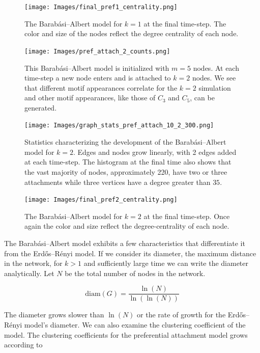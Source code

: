 \begin{figure}
    \texttt{[image: Images/final\_pref1\_centrality.png]}
    \centering
    \caption{The Barabási–Albert model for $k=1$ at the final time-step. The color and size of the nodes reflect
            the degree centrality of each node.}
\end{figure}

\begin{figure}[h!]
    \texttt{[image: Images/pref\_attach\_2\_counts.png]}
    \centering
    \caption{This Barabási–Albert model is initialized with $m=5$ nodes.
    At each time-step a new node enters and is attached to $k=2$ nodes. We see that different motif appearances
    correlate for the $k=2$ simulation and other motif appearances, like those of $C_3$ and $C_5$, can be generated.}
    \label{fig:BA2}
\end{figure}

\begin{figure}[h!]
    \texttt{[image: Images/graph\_stats\_pref\_attach\_10\_2\_300.png]}
    \centering
    \caption{Statistics characterizing the development of the Barabási–Albert model for $k=2$.
    Edges and nodes grow linearly, with 2 edges added at each time-step. The histogram at
    the final time also shows that the vast majority of nodes, approximately 220, have two or three attachments
    while three vertices have a degree greater than $35$.}
\end{figure}

\begin{figure}
    \texttt{[image: Images/final\_pref2\_centrality.png]}
    \centering
    \caption{The Barabási–Albert model for $k=2$ at the final time-step. Once again the color and size
            reflect the degree-centrality of each node.}
\end{figure}

The Barabási–Albert model exhibits a few characteristics that differentiate it from the 
Erdős–Rényi model. If we consider its diameter, the maximum distance in the network,
for $k>1$ and sufficiently large time we can write the diameter analytically. Let $N$ be the 
total number of nodes in the network.

$$\text{diam}(G) = \frac{\ln(N)}{\ln(\ln (N))}$$

The diameter grows slower than $\ln(N)$ or the rate of growth for the
Erdős–Rényi model's diameter. We can also examine the clustering coefficient of the model. 
The clustering coefficients for the preferential attachment model grows according to \cite{klemm_2002}

